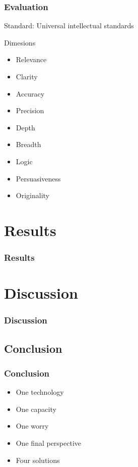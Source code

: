 \documentclass{beamer}
\begin{document}
\begin{frame}
    \frametitle{Evaluation}
    \Large{Standard: Universal intellectual standards}
    \begin{block}{Dimesions}
        \begin{multicols}{2}
            \begin{itemize}
                \item Relevance
                \item Clarity
                \item Accuracy
                \item Precision
                \item Depth
                \item Breadth
                \item Logic
                \item Persuasiveness
                \item Originality
            \end{itemize}
        \end{multicols}
    \end{block}

\end{frame}

\section{Results}
\begin{frame}
    \frametitle{Results}
\end{frame}

\section{Discussion}
\begin{frame}
    \frametitle{Discussion}
\end{frame}

\subsection{Conclusion}
\begin{frame}
    \frametitle{Conclusion}
    \Large
    \begin{itemize}
        \item<1-> One technology
        \item<2-> One capacity
        \item<3-> One worry
        \item<4-> One final perspective
        \item<5-> Four solutions
    \end{itemize}
\end{frame}
\end{document}
